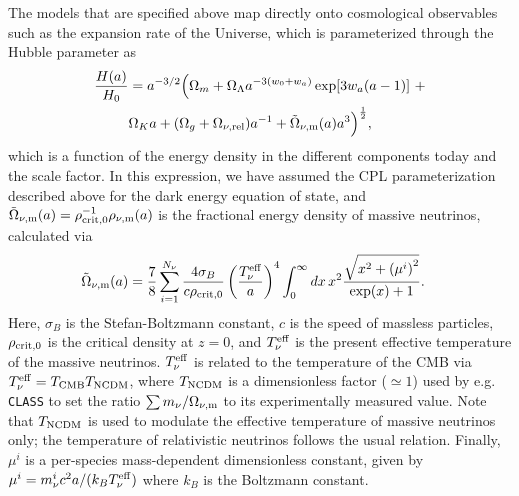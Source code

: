 \documentclass[\docopts]{\docclass}
\begin{document}
The models that are specified above map directly onto cosmological observables such as the expansion rate of the Universe, which is parameterized through the Hubble parameter as
\begin{align}\label{eq:Ha}
\frac{H(a)}{H_0} &= a^{-3/2}\Big(\Omega_{m}+\Omega_{\Lambda} a^{-3(w_0+w_a)}
    \exp[3 w_a (a-1)]~+ \nonumber \\ &\Omega_{K} a + (\Omega_{g} + \Omega_{\nu, {\rm rel}}) a^{-1} + \tilde\Omega_{\nu, {\rm m}}(a)a^3\Big)^{\frac{1}{2}} ,
\end{align}
which is a function of the energy density in the different components today and the scale factor. In this expression, we have assumed the CPL parameterization described above for the dark energy equation of state, and $\tilde\Omega_{\nu, {\rm m}}(a) = \rho^{-1}_{\rm crit,0} \rho_{\nu, {\rm m}}(a)$ is the fractional energy density of massive neutrinos, calculated via
\begin{align}
\tilde\Omega_{\nu, {\rm m}}(a) &= \frac{7}{8}\sum_{i=1}^{N_\nu} \frac{4 \sigma_{B}}{c \rho_{{\rm crit},0}} \left(\frac{T_{\nu}^{\rm eff}}{a}\right)^4  \int_0^{\infty} dx \, x^2 \frac{\sqrt{x^2 + \left(\mu^i\right)^2}}{\exp(x) + 1}.
\label{Omnu}
\end{align}
Here, $\sigma_B$ is the Stefan-Boltzmann constant, $c$ is the speed of massless particles, $\rho_{{\rm crit},0}$ is the critical density at $z=0$, and $T_{\nu}^{\rm eff}$ is the present effective temperature of the massive neutrinos. $T_{\nu}^{\rm eff}$ is related to the temperature of the CMB via $T_{\nu}^{\rm eff} = T_{\rm CMB} T_{\rm NCDM}$, where $T_{\rm NCDM}$ is a dimensionless factor ($\simeq1$) used by e.g. {\tt CLASS} to set the ratio ${\sum m_\nu}/{\Omega_{\nu, {\rm m}}}$ to its experimentally measured value. Note that $T_{\rm NCDM}$ is used to modulate the effective temperature of massive neutrinos only; the temperature of relativistic neutrinos follows the usual relation. Finally, $\mu^i$ is a per-species mass-dependent dimensionless constant, given by $\mu^i = m_{\nu}^{i}c^2 a / (k_B T_{\nu}^{\rm eff})$ where $k_B$ is the Boltzmann constant.
\end{document}
